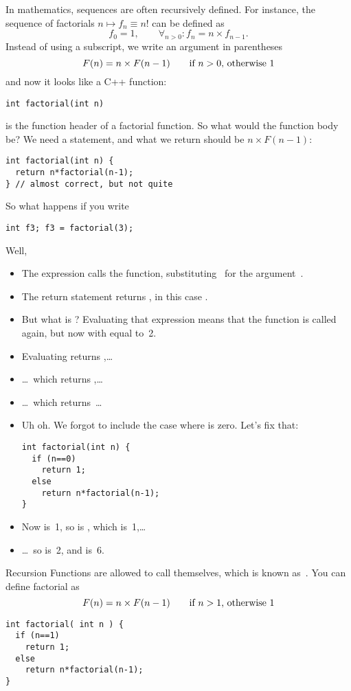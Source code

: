 In mathematics, sequences are often recursively defined. For instance,
the sequence of factorials $n\mapsto f_n\equiv n!$ can be defined as
\[ f_0=1,\qquad \forall_{n>0}\colon f_n=n\times f_{n-1}. \]
Instead of using a subscript, we write an argument in parentheses
\[ F(n) = n \times F(n-1) \qquad \hbox{if $n>0$, otherwise~$1$} \]
and now it looks like a C++ function:
\begin{verbatim}
int factorial(int n)
\end{verbatim}
is the function header of a factorial function. So what would the
function body be? We need a  statement, and what we return
should be $n \times F(n-1)$:
\begin{verbatim}
int factorial(int n) {
  return n*factorial(n-1);
} // almost correct, but not quite
\end{verbatim}
So what happens if you write
\begin{verbatim}
int f3; f3 = factorial(3);
\end{verbatim}
Well,
\begin{itemize}
\item The expression  calls the 
  function, substituting~ for the argument~.
\item The return statement returns , in this case
  .
\item But what is ? Evaluating that expression means
  that the  function is called again, but now with 
  equal to~2.
\item Evaluating  returns ,\ldots
\item \ldots~which returns ,\ldots
\item \ldots~which returns~\ldots
\item Uh oh. We forgot to include the case where  is zero. Let's
  fix that:
\begin{verbatim}
int factorial(int n) {
  if (n==0)
    return 1;
  else
    return n*factorial(n-1);
}
\end{verbatim}
\item Now  is~1, so  is
  , which is~1,\ldots
\item \ldots~so  is~2, and  is~6.
\end{itemize}

\begin{slide}{Recursion}
  \label{sl:func-recur}
  Functions are allowed to call themselves, which is known
  as~. You can define factorial as
  \[ F(n) = n \times F(n-1) \qquad \hbox{if $n>1$, otherwise~$1$} \]
\begin{verbatim}
int factorial( int n ) {
  if (n==1)
    return 1;
  else
    return n*factorial(n-1);
}
\end{verbatim}
\end{slide}

